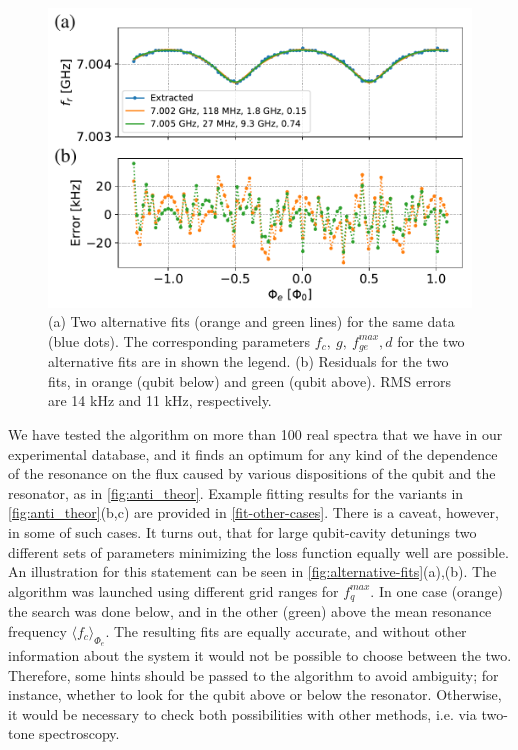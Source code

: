 \documentclass[%
 aip,
 amsmath,amssymb,
 reprint,%
]{revtex4-1}
\begin{document}
\begin{figure}
\centering
\includegraphics[width=\linewidth]{alternative_fits}
\caption{(a) Two alternative fits (orange and green lines) for the same data (blue dots). The corresponding parameters $f_c,\ g,\ f_{ge}^{max}, d$ for the two alternative fits are in shown the legend. (b) Residuals for the two fits, in orange (qubit below) and green (qubit above). RMS errors are 14 kHz and 11 kHz, respectively.}
\label{fig:alternative-fits}
\end{figure}

We have tested the algorithm on more than 100 real spectra that we have in our experimental database, and it finds an optimum for any kind of the dependence of the resonance on the flux caused by various dispositions of the qubit and the resonator, as in \autoref{fig:anti_theor}. Example fitting results for the variants in \autoref{fig:anti_theor}(b,c) are provided in \autoref{fit-other-cases}. There is a caveat, however, in some of such cases. It turns out, that for large qubit-cavity detunings two different sets of parameters minimizing the loss function equally well are possible. An illustration for this statement can be seen in \autoref{fig:alternative-fits}(a),(b). The algorithm was launched using different grid ranges for $f_q^{max}$. In one case (orange) the search was done below, and in the other (green) above the mean resonance frequency $\langle f_c\rangle_{\Phi_e}$. The resulting fits are equally accurate, and without other information about the system it would not be possible to choose between the two. Therefore, some hints should be passed to the algorithm to avoid ambiguity; for instance, whether to look for the qubit above or below the resonator. Otherwise, it would be necessary to check both possibilities with other methods, i.e. via two-tone spectroscopy.
\end{document}
